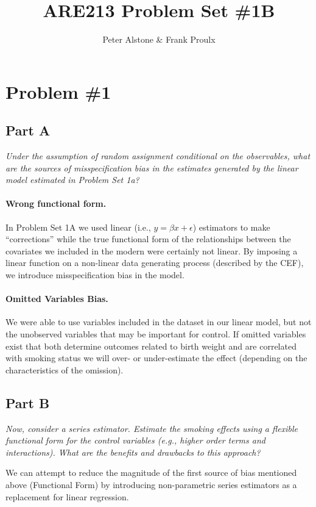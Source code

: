 \documentclass[letterpaper, 12pt]{article}
\begin{document}
\title{ARE213 Problem Set \#1B}
\author{Peter Alstone \& Frank Proulx}
\maketitle

\section{Problem \#1}
\subsection{Part A}
\emph{Under the assumption of random assignment conditional on the observables, what are the sources of misspecification bias in the estimates generated by the linear model estimated in Problem Set 1a?}

\paragraph{Wrong functional form.}
In Problem Set 1A we used linear (i.e., $ y = \beta x + \epsilon$) estimators to make ``corrections'' while the true functional form of the relationships between the covariates we included in the modern were certainly not linear.  By imposing a linear function on a non-linear data generating process (described by the CEF), we introduce misspecification bias in the model.  

\paragraph{Omitted Variables Bias.}  We were able to use variables included in the dataset in our linear model, but not the unobserved variables that may be important for control.  If omitted variables exist that both determine outcomes related to birth weight and are correlated with smoking status we will over- or under-estimate the effect (depending on the characteristics of the omission).   


\subsection{Part B}
\emph{Now, consider a series estimator. Estimate the smoking effects using a flexible functional form for the control variables (e.g., higher order terms and interactions). What are the benefits and drawbacks to this approach?}

We can attempt to reduce the magnitude of the first source of bias mentioned above (Functional Form) by introducing non-parametric series estimators as a replacement for linear regression.  
\end{document}
